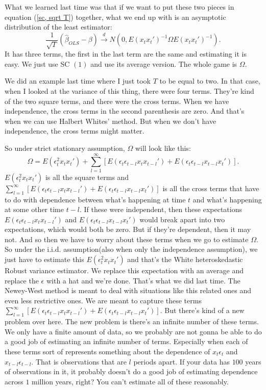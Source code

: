 \documentclass[11pt,a4paper]{amsart}
\theoremstyle{plain}
\theoremstyle{definition}
\begin{document}
    	 	 What we learned last time was that if we want to put these two pieces in equation (\ref{sc, sqrt T}) together, what we end up with is an asymptotic distribution of the least estimator:
    	 	 \[		\frac{1}{\sqrt{T}}(\hat{\beta}_{OLS} - \beta) \stackrel{d}{\longrightarrow} N(0, E(x_{t}x_{t}')^{-1} \Omega E(x_{t}x_{t}')^{-1}).	\]
    	 	 It has three terms, the first in the last term are the same and estimating it is easy. We just use SC $(1)$ and use its average version. The whole game is $\Omega$.\par 
    	 	 We did an example last time where I just took $T$ to be equal to two.  In that case, when I looked at the variance of this thing, there were four terms.  They're kind of the two square terms, and there were the cross terms. When we have independence, the cross terms in the second parenthesis are zero. And that's when we can use Halbert Whites' method. But when we don't have independence, the cross terms might matter.\par 
    	 	  So under strict stationary assumption, $\Omega$ will look like this:
    	 	  \[	\Omega = E(\epsilon_{t}^{2}x_{t}x_{t}') + \sum_{ l = 1}^{\infty}[E(\epsilon_{t} \epsilon_{t-l} x_{t} x_{t-l}') + E(\epsilon_{t} \epsilon_{t-l} x_{t-l}x_{t}') ].	\]
    	 	  $E(\epsilon_{t}^{2}x_{t}x_{t}')$ is all the square terms and $\sum_{ l = 1}^{\infty}[E(\epsilon_{t} \epsilon_{t-l} x_{t} x_{t-l}') + E(\epsilon_{t} \epsilon_{t-l} x_{t-l}x_{t}') ]$ is all the cross terms that have to do with dependence between what's happening at time $t$ and what's happening at some other time $t - l$. If these were independent, then these expectations $E(\epsilon_{t} \epsilon_{t-l} x_{t} x_{t-l}')$ and $E(\epsilon_{t} \epsilon_{t-l} x_{t-l}x_{t}')$ would break apart into two expectations, which would both be zero. But if they're dependent, then it may not. And so then we have to worry about these terms when we go to estimate $\Omega$. So under the i.i.d. assumption(also when only the independence assumption), we just have to estimate this $E(\epsilon_{t}^{2}x_{t}x_{t}')$ and that's the White heteroskedastic Robust variance estimator. We replace this expectation with an average and replace the $\epsilon$ with a hat and we're done. That's what we did last time. The Newey-West method is meant to deal with situations like this related ones and even less restrictive ones. We are meant to capture these terms $\sum_{ l = 1}^{\infty}[E(\epsilon_{t} \epsilon_{t-l} x_{t} x_{t-l}') + E(\epsilon_{t} \epsilon_{t-l} x_{t-l}x_{t}') ]$. But there's kind of a new problem over here. The new problem is there's an infinite number of these terms. We only have a finite amount of data, so we probably are not gonna be able to do a good job of estimating an infinite number of terms. Especially when each of these terms sort of represents something about the dependence of $x_{t}\epsilon_{t}$ and $x_{t-l}\epsilon_{t-l}$. That is observations that are $l$ periods apart. If your data has $100$ years of observations in it, it probably doesn't do a good job of estimating dependence across $1$ million years, right? You can't estimate all of these reasonably.\par 
\end{document}
